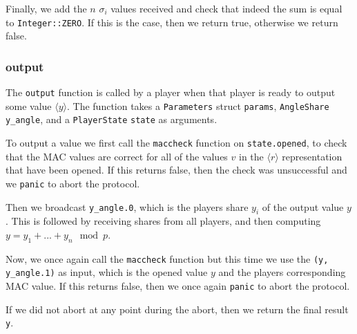 \documentclass[../main.tex]{subfiles}
\begin{document}
Finally, we add the $n$ $\sigma_i$ values received and check that indeed the sum is equal to \lstinline{Integer::ZERO}. If this is the case, then we return true, otherwise we return false.

\subsubsection{output}
The \lstinline{output} function is called by a player when that player is ready to output some value $\langle y \rangle$. The function takes a \lstinline{Parameters} struct \lstinline{params}, \lstinline{AngleShare} \lstinline{y_angle}, and a \lstinline{PlayerState} \lstinline{state} as arguments.

To output a value we first call the \lstinline{maccheck} function on \lstinline{state.opened}, to check that the MAC values are correct for all of the values $v$ in the $\langle r \rangle$ representation that have been opened. If this returns false, then the check was unsuccessful and we \lstinline{panic} to abort the protocol.

Then we broadcast \lstinline{y_angle.0}, which is the players share $y_i$ of the output value $y$. This is followed by receiving shares from all players, and then computing $y = y_1 + ... + y_n \mod p$.

Now, we once again call the \lstinline{maccheck} function but this time we use the \lstinline{(y, y_angle.1)} as input, which is the opened value $y$ and the players corresponding MAC value. If this returns false, then we once again \lstinline{panic} to abort the protocol.

If we did not abort at any point during the abort, then we return the final result \lstinline{y}.
\end{document}
